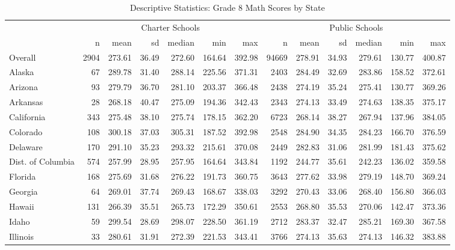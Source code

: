 \begin{sidewaystable}[htb]
\begin{center}
\caption{Descriptive Statistics: Grade 8 Math Scores by State}
\label{g8mathdesc}
{\smaller
\begin{tabular}{lrrrrrr@{\extracolsep{10pt}}rrrrrr}
  \hline & \multicolumn{6}{c}{Charter Schools} & \multicolumn{6}{c}{Public Schools} \\ \cline{2-7} \cline{8-13} & n & mean & sd & median & min & max & n & mean & sd & median & min & max \\ 
  \hline
Overall & 2904 & 273.61 & 36.49 & 272.60 & 164.64 & 392.98 & 94669 & 278.91 & 34.93 & 279.61 & 130.77 & 400.87 \\ 
  Alaska &  67 & 289.78 & 31.40 & 288.14 & 225.56 & 371.31 & 2403 & 284.49 & 32.69 & 283.86 & 158.52 & 372.61 \\ 
  Arizona &  93 & 279.79 & 36.70 & 281.10 & 203.37 & 366.48 & 2438 & 274.19 & 35.24 & 275.41 & 130.77 & 369.26 \\ 
  Arkansas &  28 & 268.18 & 40.47 & 275.09 & 194.36 & 342.43 & 2343 & 274.13 & 33.49 & 274.63 & 138.35 & 375.17 \\ 
  California & 343 & 275.48 & 38.10 & 275.74 & 178.15 & 362.20 & 6723 & 268.14 & 38.27 & 267.94 & 137.96 & 384.05 \\ 
  Colorado & 108 & 300.18 & 37.03 & 305.31 & 187.52 & 392.98 & 2548 & 284.90 & 34.35 & 284.23 & 166.70 & 376.59 \\ 
  Delaware & 170 & 291.10 & 35.23 & 293.32 & 215.61 & 370.08 & 2449 & 282.83 & 31.06 & 281.99 & 181.43 & 375.62 \\ 
  Dist. of Columbia & 574 & 257.99 & 28.95 & 257.95 & 164.64 & 343.84 & 1192 & 244.77 & 35.61 & 242.23 & 136.02 & 359.58 \\ 
  Florida & 168 & 275.69 & 31.68 & 276.22 & 191.73 & 360.75 & 3643 & 277.62 & 33.98 & 279.19 & 148.70 & 369.24 \\ 
  Georgia &  64 & 269.01 & 37.74 & 269.43 & 168.67 & 338.03 & 3292 & 270.43 & 33.06 & 268.40 & 156.80 & 366.03 \\ 
  Hawaii & 131 & 266.39 & 35.51 & 265.73 & 172.29 & 350.61 & 2553 & 268.80 & 35.53 & 270.06 & 142.47 & 373.36 \\ 
  Idaho &  59 & 299.54 & 28.69 & 298.07 & 228.50 & 361.19 & 2712 & 283.37 & 32.47 & 285.21 & 169.30 & 367.58 \\ 
  Illinois &  33 & 280.61 & 31.91 & 272.39 & 221.53 & 343.41 & 3766 & 274.13 & 35.63 & 274.13 & 146.32 & 383.88 \\ 

\end{tabular}}
\end{center}
\end{sidewaystable}
